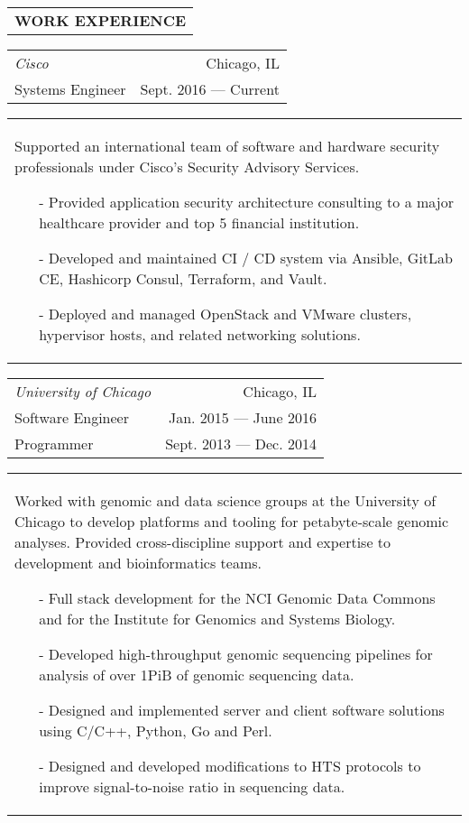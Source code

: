 \begin{tabularx}{\textwidth}{L}
    \textbf{WORK EXPERIENCE}
\end{tabularx}

\begin{tabularx}{\textwidth}{L R}
    \normalsize\textit{Cisco} & Chicago, IL \\
    Systems Engineer & Sept. 2016 --- Current \\
\end{tabularx}
\begin{tabularx}{\textwidth}{X}
    \vspace{1pt}
    Supported an international team of software and hardware security professionals under Cisco's Security Advisory Services.
    \begin{itemize}
        \itemsep{}
        \item[-] Provided application security architecture consulting to a major healthcare provider and top 5 financial institution.
        \item[-] Developed and maintained CI / CD system via Ansible, GitLab CE, Hashicorp Consul, Terraform, and Vault.
        \item[-] Deployed and managed OpenStack and VMware clusters, hypervisor hosts, and related networking solutions.
    \end{itemize}
\end{tabularx}

\begin{tabularx}{\textwidth}{L R}
    \normalsize\textit{University of Chicago} & Chicago, IL \\
    Software Engineer & Jan. 2015 --- June 2016 \\
    Programmer & Sept. 2013 --- Dec. 2014 \\
\end{tabularx}
\begin{tabularx}{\textwidth}{X}
    \vspace{1pt}
    Worked with genomic and data science groups at the University of Chicago to develop platforms and tooling for petabyte-scale genomic analyses. Provided cross-discipline support and expertise to development and bioinformatics teams.
    \begin{itemize}
        \itemsep{}
        \item[-] Full stack development for the NCI Genomic Data Commons and for the Institute for Genomics and Systems Biology.
        \item[-] Developed high-throughput genomic sequencing pipelines for analysis of over 1PiB of genomic sequencing data.
        \item[-] Designed and implemented server and client software solutions using C/C++, Python, Go and Perl.
        \item[-] Designed and developed modifications to HTS protocols to improve signal-to-noise ratio in sequencing data.
    \end{itemize}
\end{tabularx}

